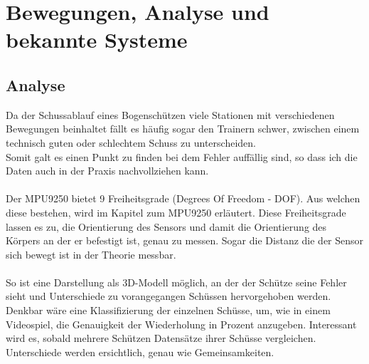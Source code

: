 \chapter{Bewegungen, Analyse und bekannte Systeme}
\section{Analyse}
Da der Schussablauf eines Bogenschützen viele Stationen mit verschiedenen Bewegungen 
beinhaltet fällt es häufig sogar den Trainern schwer, zwischen einem technisch guten
oder schlechtem Schuss zu unterscheiden.\\ 
Somit galt es einen Punkt zu finden bei dem Fehler auffällig sind, so dass ich die Daten auch in 
der Praxis nachvollziehen kann.\\
\\
Der MPU9250 bietet 9 Freiheitsgrade (Degrees Of Freedom - DOF). Aus welchen diese bestehen, wird
im Kapitel zum MPU9250 erläutert. Diese Freiheitsgrade lassen es zu, die Orientierung des Sensors 
und damit die Orientierung des Körpers an der er befestigt ist, genau zu messen. Sogar die Distanz 
die der Sensor sich bewegt ist in der Theorie messbar.\\
\\
So ist eine Darstellung als 3D-Modell möglich, an der der Schütze seine Fehler sieht und Unterschiede
zu vorangegangen Schüssen hervorgehoben werden. \\
Denkbar wäre eine Klassifizierung der einzelnen Schüsse, um, wie in einem Videospiel, die Genauigkeit
der Wiederholung in Prozent anzugeben. Interessant wird es, sobald mehrere Schützen Datensätze
ihrer Schüsse vergleichen. Unterschiede werden ersichtlich, genau wie Gemeinsamkeiten.\\

